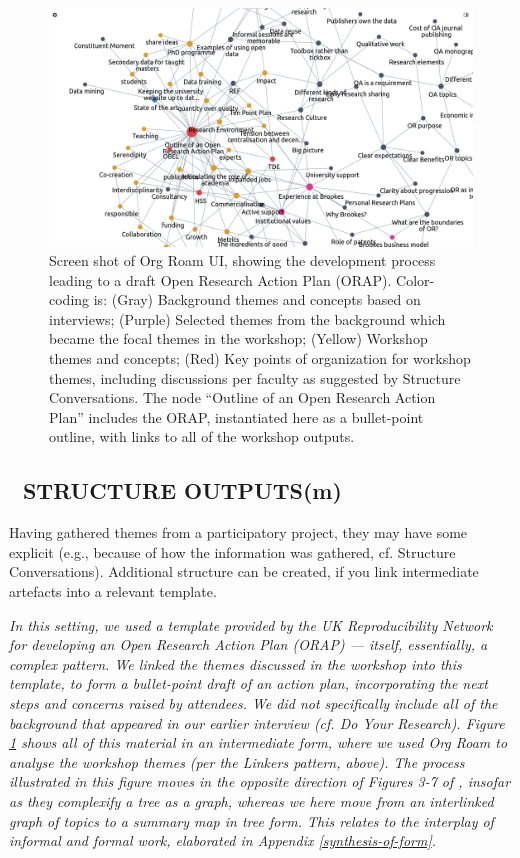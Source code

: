 \documentclass[acmlarge,timestamp]{acmart}
\newcommand{\motor}{(m)}
\begin{document}
\begin{figure}
  \includegraphics[width=\textwidth,trim={0 0 0 2cm},clip=true]{org-roam-screenshot.png}
  \caption{Screen shot of Org Roam UI, showing the development process
    leading to a draft Open Research Action Plan (ORAP).  Color-coding
    is: (Gray) Background themes and concepts based on interviews;
    (Purple) Selected themes from the background which became the
    focal themes in the workshop; (Yellow) Workshop themes and
    concepts; (Red) Key points of organization for workshop themes,
    including discussions per faculty as suggested by {\sc Structure
      Conversations}. The node “Outline of an Open Research Action
    Plan” includes the ORAP, instantiated here as a bullet-point
    outline, with links to all of the workshop outputs.
    \label{Org-Roam-Screenshot}}
\end{figure}

\subsection*{💎 STRUCTURE OUTPUTS{\hfill\motor}}
Having gathered themes from a participatory project, they may have
some explicit (e.g., because of how the information was gathered,
cf. {\sc Structure Conversations}).  Additional structure can be
created, if you link intermediate artefacts into a relevant template.

\smallskip

\noindent \emph{In this setting, we used a template provided by the UK
Reproducibility Network for developing an Open Research Action Plan
(ORAP) \cite{orap-template} — itself, essentially, a complex pattern.
We linked the themes discussed in the workshop into this template, to
form a bullet-point draft of an action plan, incorporating the next
steps and concerns raised by attendees.  We did not specifically
include all of the background that appeared in our earlier interview
(cf. {\sc Do Your Research}).  Figure \ref{Org-Roam-Screenshot} shows
all of this material in an intermediate form, where we used Org Roam
to analyse the workshop themes (per the {\sc Linkers} pattern, above).
The process illustrated in this figure moves in the opposite direction
of \emph{Figures 3-7} of \citet{iba2016pattern}, insofar as they
complexify a tree as a graph, whereas we here move from an interlinked
graph of topics to a summary map in tree form.  This relates to the
interplay of informal and formal work, elaborated in Appendix
\ref{synthesis-of-form}.}
\end{document}
